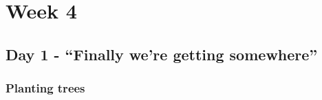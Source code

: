 \cleardoublepage
\chapter{Week 4}
\section{Day 1 - ``Finally we're getting somewhere''}
\subsection{Planting trees}

